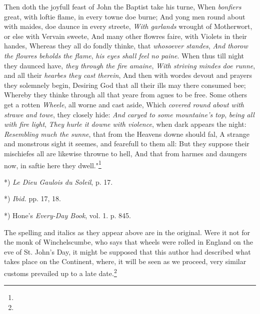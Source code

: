 \documentclass[a4paper, 11pt, oneside, polutonikogreek, english]{article}
\begin{document}
Then doth the joyfull feast of John  
the Baptist take his turne,  
When \emph{bonfiers} great, with loftie flame,  
in every towne doe burne;  
And yong men round about with maides,  
doe daunce in every streete,  
\emph{With garlands} wrought of Motherwort,  
or else with Vervain sweete,  
And many other flowres faire,  
with Violets in their handes,  
Whereas they all do fondly thinke,  
that \emph{whosoever standes},  
\emph{And thorow the flowres beholds the flame},  
\emph{his eyes shall feel no paine}.  
When thus till night they daunced have,  
\emph{they through the fire amaine},  
\emph{With striving mindes doe runne}, and all  
their \emph{hearbes they cast therein},  
And then with wordes devout and prayers  
they solemnely begin,  
Desiring God that all their ills  
may there consumed bee;  
Whereby they thinke through all that yeare  
from agues to be free.  
Some others get a rotten \emph{Wheele},  
all worne and cast aside,  
Which \emph{covered round about with strawe}  
\emph{and towe}, they closely hide:  
\emph{And caryed to some mountaine's top},  
\emph{being all with fire light},  
\emph{They hurle it downe with violence},  
when dark appears the night:  
\emph{Resembling much the sunne}, that from  
the Heavens downe should fal,  
A strange and monstrous sight it seemes,  
and fearefull to them all:  
But they suppose their mischiefes all  
are likewise throwne to hell,  
And that from harmes and daungers now,  
in saftie here they dwell."\footnote{}

*) \emph{Le Dieu Gaulois du Soleil}, p. 17.

*) \emph{Ibid.} pp. 17, 18.

*) Hone's \emph{Every-Day Book}, vol. 1. p. 845.

The spelling and italics as they appear above are in the original. Were it not for the monk of Winchelscumbe, who says that wheels were rolled in England on the eve of St. John's Day, it might be supposed that this author had described what takes place on the Continent, where, it will be seen as we proceed, very similar customs prevailed up to a late date.\footnote{}
\end{document}
